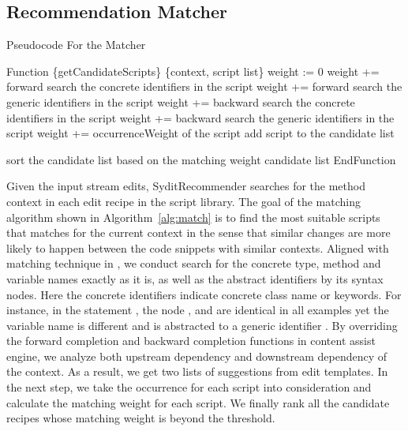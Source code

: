 \subsection {Recommendation Matcher}\label{sec:matcher}


\begin{algorithm}
\caption{Pseudocode For the Matcher}
\label{alg:match}
\begin{algorithmic} 
\STATE  Function \{getCandidateScripts\} \{context, script list\}
 \STATE weight := 0
  \STATE weight += forward search the concrete identifiers in the script 
    \STATE weight +=  forward search the generic identifiers in the script 
      \STATE weight +=  backward search the concrete identifiers in the script
  \STATE weight +=  backward search the generic identifiers in the script
   \STATE weight += occurrenceWeight of the script
  \STATE add script to the candidate list
  \ENDIF

    \ENDFOR
  \STATE sort the candidate list based on the matching weight
\RETURN candidate list
\STATE EndFunction

%
\end{algorithmic}
\end{algorithm}

Given the input stream edits, SyditRecommender searches for the method context in each edit recipe in the script library. The goal of the matching algorithm shown in Algorithm~\ref{alg:match} is to find the most suitable scripts that matches for the current context in the sense that similar changes are more likely to happen between the code snippets with similar contexts. Aligned with matching technique in \cite{meng:sydit, meng:lase}, we conduct search for the concrete type, method and variable names exactly as it is, as well as the abstract identifiers by its syntax nodes. Here the concrete identifiers indicate concrete class name or keywords. For instance, in the statement  , the node \codefont{=},    and   are identical in all examples yet the variable name   is different and is abstracted to a generic identifier   .   By overriding the forward completion and backward completion functions in content assist engine, we analyze both upstream dependency and downstream dependency of the context. As a result, we get two lists of suggestions from edit templates. In the next step, we take the occurrence for each script into consideration and calculate the matching weight for each script. We finally rank all the candidate recipes whose matching weight is beyond the threshold. 



